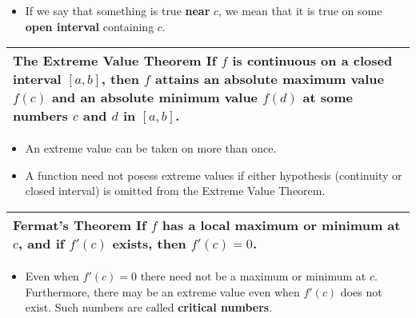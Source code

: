 \documentclass{article}
\begin{document}
\large
\vspace{5pt}
\begin{itemize}[leftmargin=5pt]
	\item If we say that something is true \textbf{near} $c$, we mean that it is true on some \textbf{open interval} containing $c$.
\end{itemize}
\vspace{12pt}

\begin{center}
\large
\def\arraystretch{1.3}
{\setlength{\tabcolsep}{16pt}
\begin{tabularx}{.9\textwidth}{|X|}
\hline
	\textbf{The Extreme Value Theorem} \: If $f$ is continuous on a closed interval $[a,b]$, then $f$ attains an absolute maximum value $f(c)$ and an absolute minimum value $f(d)$ at some numbers $c$ and $d$ in $[a,b]$.\\
\hline
\end{tabularx}}
\end{center}

\large
\vspace{5pt}
\begin{itemize}[leftmargin=5pt]
	\item An extreme value can be taken on more than once.
	\item A function need not posess extreme values if either hypothesis (continuity or closed interval) is omitted from the Extreme Value Theorem.
\end{itemize}
\vspace{12pt}

\begin{center}
\large
\def\arraystretch{1.3}
{\setlength{\tabcolsep}{16pt}
\begin{tabularx}{.9\textwidth}{|X|}
\hline
	\textbf{Fermat's Theorem} \: If $f$ has a local maximum or minimum at $c$, and if $f'(c)$ exists, then $f'(c) = 0$.\\
\hline
\end{tabularx}}
\end{center}

\large
\vspace{5pt}
\begin{itemize}[leftmargin=5pt]
	\item Even when $f'(c) = 0$ there need not be a maximum or minimum at $c$. Furthermore, there may be an extreme value even when $f'(c)$ does not exist.  Such numbers are called \textbf{critical numbers}.
\end{itemize}
\vspace{12pt}
\end{document}
